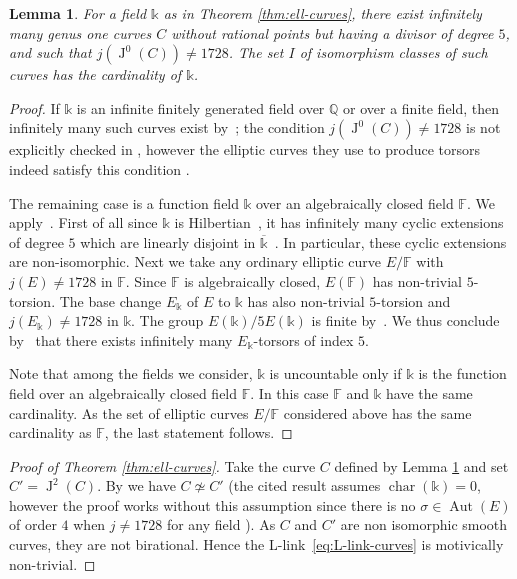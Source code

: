 \documentclass[a4paper,12pt]{amsart}
\def\F{\mathbb F}
\def\k{\mathbb k}
\def\Q{\mathbb Q}
\def\chr{{\operatorname{char}}}
\def\Aut{{\operatorname{Aut}}}
\def\chr{{\operatorname{char}}}
\def\Jac{{\operatorname{J}}}
\def\ol{\overline}
\theoremstyle{plain}
\newtheorem{lemma}[dummy]{Lemma}
\numberwithin{equation}{section}
\theoremstyle{definition}
\newcommand{\gs}{\sigma}
\renewcommand{\(}{\left(}
\renewcommand{\)}{\right)}
\begin{document}
\begin{lemma}\cite{Lang-Tate, ClarkLacy}
\label{lem:torsors}
For a field $\k$ 
as in Theorem \ref{thm:ell-curves},
there exist infinitely many 
genus one
curves $C$
without rational
points but having 
a divisor of degree $5$,
and such that $j(\Jac^0(C)) \ne 1728$.
The set $I$ of isomorphism classes of such curves has the cardinality of $\k$.
\end{lemma}
\begin{proof}
If $\k$ is an infinite 
finitely generated field over $\Q$ or over a finite field, 
then infinitely many
such curves exist by~\cite[Theorem 1.10]{ClarkLacy};
the condition $j(\Jac^0(C)) \ne 1728$ is not explicitly
checked in \cite{ClarkLacy}, however the elliptic
curves they use to produce torsors indeed satisfy this condition \cite[Section 4]{ClarkLacy}.

The remaining case is
a function field $\k$ over an algebraically
closed field $\F$. 
We apply~\cite[Theorem 7]{Lang-Tate}.
First of all since $\k$ is Hilbertian~\cite[Proposition 12.3.3, Theorem 13.4.2]{MR2445111},
it has infinitely many cyclic extensions
of degree $5$ which are
linearly disjoint in $\ol{\k}$~\cite[Corollary 16.2.7]{MR2445111}. 
In particular, these cyclic extensions are non-isomorphic.
Next we take any ordinary elliptic
curve $E/\F$
with $j(E) \ne 1728$ in $\F$.
Since $\F$ is algebraically closed,
$E(\F)$ has non-trivial $5$-torsion.
The base change $E_\k$ of $E$ to $\k$
has also non-trivial $5$-torsion
and $j(E_\k) \ne 1728$ in $\k$.
The group $E(\k) / 5E(\k)$
is finite by~\cite[Remark 1.3, Proposition 1.4]{ClarkLacy}. 
We thus conclude by~\cite[Theorem 7]{Lang-Tate}
that there exists infinitely many $E_\k$-torsors of index $5$.

Note that among the fields we consider, $\k$ is uncountable only if $\k$ is the function field over an algebraically closed field $\F$.
In this case $\F$ and $\k$ have the same cardinality.
As the set of elliptic curves $E/\F$
considered above has the same cardinality as $\F$,
the last statement follows.
\end{proof}

\begin{proof}[Proof of Theorem \ref{thm:ell-curves}]
Take the curve $C$ defined
by Lemma \ref{lem:torsors}
and set $C' = \Jac^2(C)$.
By \cite[Lemma 2.7]{ShinderZhang}
we have $C \not\simeq C'$
(the cited result assumes $\chr(\k) = 0$,
however the proof works without this assumption
since
there is no $\gs \in \Aut(E)$ of order $4$ when $j \ne 1728$
for any field
\cite[Proposition A.1.2]{SilvermanAEC}).
As $C$ and $C'$ are non isomorphic smooth curves, they are
not birational.
Hence the L-link~\eqref{eq:L-link-curves} is motivically non-trivial.
\end{proof}
\end{document}

